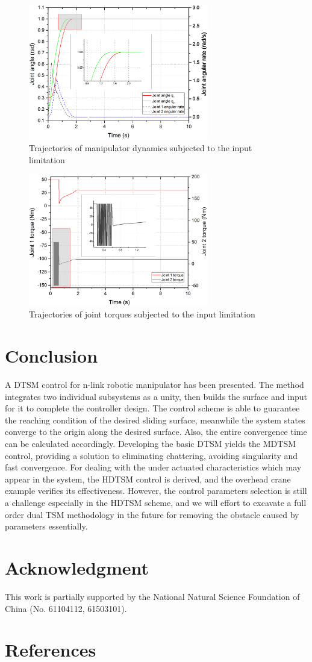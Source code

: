 \documentclass[3p]{elsarticle}
\theoremstyle{plain}
\theoremstyle{remark}
\begin{document}
\begin{figure}
\centering
\includegraphics[width=0.7\textwidth]{paper3_fig_limitation_q.eps}
\caption{Trajectories of manipulator dynamics subjected to the input limitation}
\label{Figure:limitation_q}
\end{figure}
\begin{figure}
\centering
\includegraphics[width=0.7\textwidth]{paper3_fig_limitation_torque.eps}
\caption{Trajectories of joint torques subjected to the input limitation}
\label{Figure:limitation_torque}
\end{figure}
\section{Conclusion}\label{sec:5}
A DTSM control for n-link robotic manipulator has been presented. The method integrates two individual subsystems as a unity, then builds the surface and input for it to complete the controller design. The control scheme is able to guarantee the reaching condition of the desired sliding surface, meanwhile the system states converge to the origin along the desired surface. Also, the entire convergence time can be calculated accordingly. Developing the basic DTSM yields the MDTSM control, providing a solution to eliminating chattering, avoiding singularity and fast convergence. For dealing with the under actuated characteristics which may appear in the system, the HDTSM control is derived, and the overhead crane example verifies its effectiveness. However, the control parameters selection is still a challenge especially in the HDTSM scheme, and we will effort to excavate a full order dual TSM methodology in the future for removing the obstacle caused by parameters essentially.
\section{Acknowledgment}
This work is partially supported by the National Natural Science Foundation of China (No. 61104112, 61503101).
\section{References}


\end{document}
